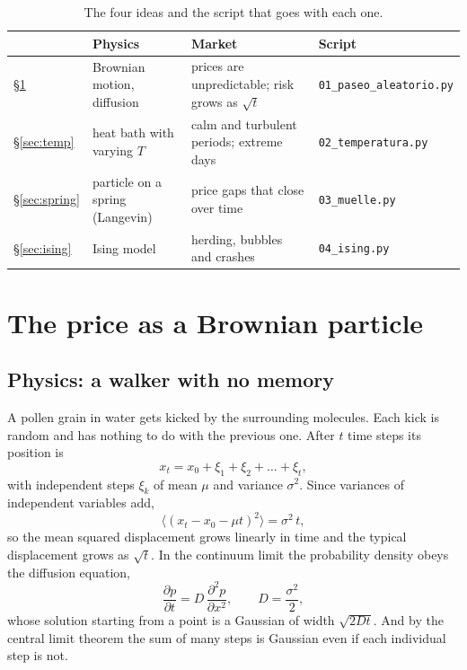 \documentclass[11pt,a4paper]{article}
\begin{document}
\begin{table}[ht]
\centering\small
\caption{The four ideas and the script that goes with each one.}
\label{tab:plan}
\begin{tabular}{@{}l>{\raggedright\arraybackslash}p{3.5cm}>{\raggedright\arraybackslash}p{5.0cm}>{\raggedright\arraybackslash}p{4.0cm}@{}}
\toprule
& Physics & Market & Script \\
\midrule
\S\ref{sec:walk} & Brownian motion, diffusion & prices are unpredictable; risk grows as $\sqrt t$ & \texttt{01\_paseo\_aleatorio.py}\\
\S\ref{sec:temp} & heat bath with varying $T$ & calm and turbulent periods; extreme days & \texttt{02\_temperatura.py}\\
\S\ref{sec:spring} & particle on a spring (Langevin) & price gaps that close over time & \texttt{03\_muelle.py}\\
\S\ref{sec:ising} & Ising model & herding, bubbles and crashes & \texttt{04\_ising.py}\\
\bottomrule
\end{tabular}
\end{table}

\section{The price as a Brownian particle}
\label{sec:walk}

\subsection{Physics: a walker with no memory}

A pollen grain in water gets kicked by the surrounding molecules. Each kick is random and has nothing to do
with the previous one. After $t$ time steps its position is
\begin{equation}
x_t=x_0+\xi_1+\xi_2+\dots+\xi_t ,
\end{equation}
with independent steps $\xi_k$ of mean $\mu$ and variance $\sigma^2$. Since variances of independent
variables add,
\begin{equation}
\langle(x_t-x_0-\mu t)^2\rangle=\sigma^2\,t ,
\label{eq:diffusion}
\end{equation}
so the mean squared displacement grows linearly in time and the typical displacement grows as $\sqrt t$. In
the continuum limit the probability density obeys the diffusion equation,
\begin{equation}
\frac{\partial p}{\partial t}=D\,\frac{\partial^2p}{\partial x^2},\qquad D=\frac{\sigma^2}{2},
\end{equation}
whose solution starting from a point is a Gaussian of width $\sqrt{2Dt}$. And by the central limit theorem
the sum of many steps is Gaussian even if each individual step is not.
\end{document}
